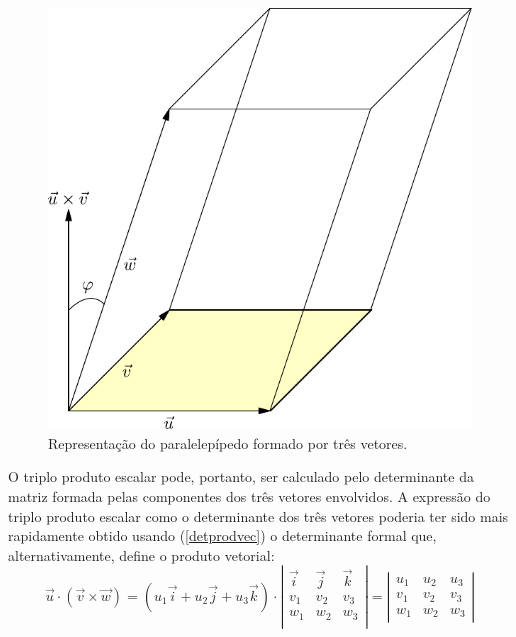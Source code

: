 \begin{figure}%
\begin{center}
   \includegraphics{./cap_algvet/figs/volume_determinante}
   \caption{Representação do paralelepípedo formado por três vetores.}\label{fig:volume_determinante}
  \end{center}\end{figure}
O triplo produto escalar pode, portanto, ser calculado pelo determinante da matriz formada pelas componentes dos três vetores envolvidos. A expressão do triplo produto escalar como o determinante dos três vetores poderia ter sido mais rapidamente obtido usando (\ref{detprodvec}) o determinante formal que, alternativamente, define o produto vetorial:
\begin{equation}
\vec{u}\cdot (\vec{v}\times \vec{w})
=\left(u_1\vec{i}+u_2\vec{j}+u_3\vec{k}\right)\cdot\left|\begin{array}{ccc}
\vec{i}&\vec{j}&\vec{k}\\
v_1 & v_2 & v_3\\
w_1 & w_2 & w_3\\
\end{array}
\right|=\left|\begin{array}{ccc}
	  u_1&u_2&u_3\\
	  v_1&v_2&v_3\\
	  w_1&w_2&w_3
       \end{array}
 \right|
\end{equation}



